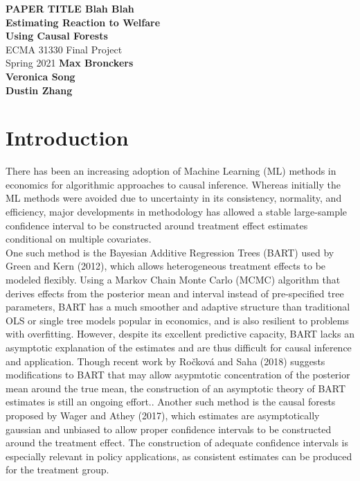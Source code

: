 \documentclass[12pt]{article}
\begin{document}
\begin{titlepage}
    \begin{center}
        \vspace*{1cm}
        \LARGE
        \textbf{PAPER TITLE Blah Blah\\ Estimating Reaction to Welfare\\ Using Causal Forests\\}
        \vspace{0.5cm}
        \Large
        ECMA 31330 Final Project \\ 
        \vspace{0.8cm}
        \large
        Spring 2021
        \vfill
        \vspace{5cm}
        \textbf{Max Bronckers \\ Veronica Song \\ Dustin Zhang}
    \end{center}
\end{titlepage}


\section{Introduction} 
There has been an increasing adoption of Machine Learning (ML) methods in
economics for algorithmic approaches to causal inference. Whereas initially the
ML methods were avoided due to uncertainty in its consistency, normality, and
efficiency, major developments in methodology has allowed a stable large-sample
confidence interval to be constructed around treatment effect estimates
conditional on multiple covariates.\cite{athey2019ML} \\

One such method is the Bayesian Additive Regression Trees (BART) used by Green and Kern (2012), which
allows heterogeneous treatment effects to be modeled flexibly. Using a Markov
Chain Monte Carlo (MCMC) algorithm that derives effects from the posterior mean
and interval instead of pre-specified tree parameters, BART has a much smoother
and adaptive structure than traditional OLS or single tree models popular in
economics, and is also resilient to problems with
overfitting.\cite{greenkern2012} However, despite its excellent predictive
capacity, BART lacks an asymptotic explanation of the estimates and are thus
difficult for causal inference and application. Though recent work by Ročková
and Saha (2018) suggests modifications to BART that may allow asypmtotic concentration of
the posterior mean around the true mean, the construction of an asymptotic
theory of BART estimates is still an ongoing effort.\cite{rockova2018theory}.
Another such method is the causal forests proposed by Wager and Athey (2017),
which estimates are asymptotically gaussian and unbiased to allow proper
confidence intervals to be constructed around the treatment effect. The
construction of adequate confidence intervals is especially relevant in policy
applications, as consistent estimates can be produced for the treatment
group.\cite{atheywager2019} \\ 
\end{document}

